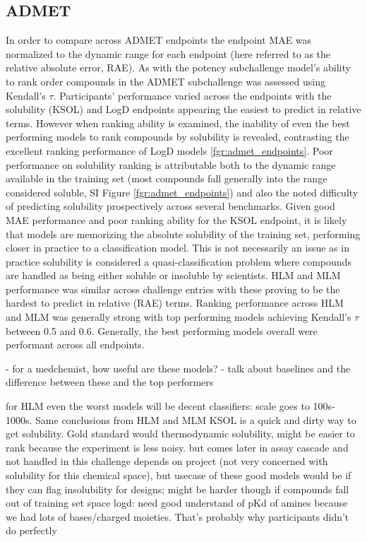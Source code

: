 \documentclass[journal=jcim,manuscript=article]{achemso}
\begin{document}
\subsection{ADMET}
In order to compare across ADMET endpoints the endpoint MAE was normalized to the dynamic range for each endpoint (here referred to as the relative absolute error, RAE). As with the potency subchallenge model's ability to rank order compounds in the ADMET subchallenge was assessed using Kendall's $\tau$. Participants' performance varied across the endpoints with the solubility (KSOL) and LogD endpoints appearing the easiest to predict in relative terms. However when ranking ability is examined, the inability of even the best performing models to rank compounds by solubility is revealed, contrasting the excellent ranking performance of LogD models \ref{fgr:admet_endpoints}.  Poor performance on solubility ranking is attributable both to the dynamic range available in the training set (most compounds fall generally into the range considered soluble, SI Figure \ref{fgr:admet_endpoints}) and also the noted difficulty of predicting solubility prospectively across several benchmarks. Given good MAE performance and poor ranking ability for the KSOL endpoint, it is likely that models are memorizing the absolute solubility of the training set, performing closer in practice to a classification model. This is not necessarily an issue as in practice solubility is considered a quasi-classification problem where compounds are handled as being either soluble or insoluble by scientists. HLM and MLM performance was similar across challenge entries with these proving to be the hardest to predict in relative (RAE) terms. Ranking performance across HLM and MLM was generally strong with top performing models achieving Kendall's $\tau$ between 0.5 and 0.6. Generally, the best performing models overall were performant across all endpoints.

- for a medchemist, how useful are these models?
- talk about baselines and the difference between these and the top performers

for HLM even the worst models will be decent classifiers: scale goes to 100s-1000s.
Same conclusions from HLM and MLM
KSOL is a quick and dirty way to get solubility. Gold standard would thermodynamic solubility, might be easier to rank because the experiment is less noisy. but comes later in assay cascade and not handled in this challenge
depends on project (not very concerned with solubility for this chemical space), but usecase of these good models would be if they can flag insolubility for designs; might be harder though if compounds fall out of training set space
logd: need good understand of pKd of amines because we had lots of bases/charged moieties. That's probably why participants didn't do perfectly
\end{document}
